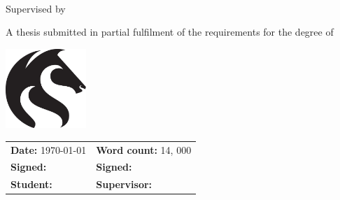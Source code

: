 
\begin{titlepage}
\makeatletter

	\vspace*{\fill}

	{
		\huge{\textbf{\textsf{\@title}}}
		\par
	}

	\vspace{0.25cm}\par
	{
		\textsf{\LARGE\textbf{\@author}} \\
		\large{Supervised by \supervisor}
		\par
	}
	\vspace{0.25cm}\par

	{
		\Large{A thesis submitted in partial fulfilment of the requirements for the degree of \degree}
		\par
	}

	\vspace{1.5cm}\par

	\begin{center}
		\includegraphics[height=3cm]{images/title/uon_logo}
		\vspace{0.25cm}\par
		\Large{\institute}
	\end{center}

	\vspace*{\fill}

	\sffamily
	\vspace{0.25cm}\par
	\begin{tabularx}{\textwidth}{@{}XX@{}}
		\textbf{Date:} \today & \textbf{Word count:} 14, 000 \\
		\textbf{Signed:} \dotfill & \textbf{Signed:} \dotfill \\
		\textbf{Student:} \dotfill & \textbf{Supervisor:} \dotfill \\
	\end{tabularx}

\makeatother
\end{titlepage}
